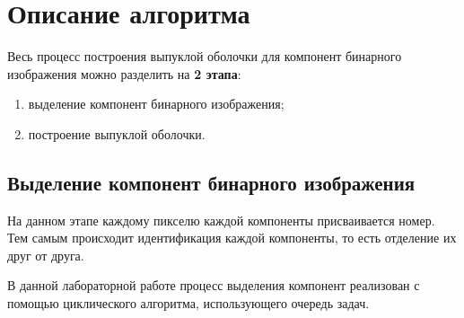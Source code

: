 \documentclass[a4paper, 12pt]{extarticle}
\newcommand{\n}{\par}
\begin{document}
	\section{Описание алгоритма}
	Весь процесс построения выпуклой оболочки для компонент бинарного изображения можно разделить на \textbf{2 этапа}:
	\begin{enumerate}
		\item выделение компонент бинарного изображения;
		\item построение выпуклой оболочки.
	\end{enumerate}
	\subsection{Выделение компонент бинарного изображения}
	На данном этапе каждому пикселю каждой компоненты присваивается номер. Тем самым происходит идентификация каждой компоненты, то есть отделение их друг от друга.\n
	В данной лабораторной работе процесс выделения компонент реализован с помощью циклического алгоритма, использующего очередь задач.
\end{document}
